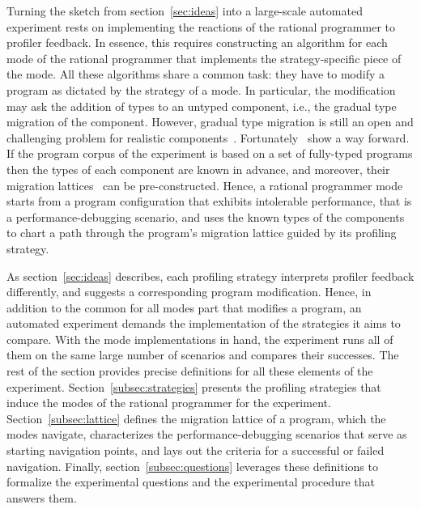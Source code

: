 
Turning the sketch from section~\ref{sec:ideas} into a large-scale
automated experiment rests on implementing the reactions of the rational
programmer to profiler feedback. In essence, this requires constructing an
algorithm for each mode of the rational programmer that implements the
strategy-specific piece of the mode. All these algorithms share a  common
task: they have to modify a program as dictated by the
strategy of a mode.  In particular, the modification may ask the addition
of types to an untyped component, i.e., the gradual type migration of the
component.  However, gradual type migration is still an open and challenging
problem for realistic components~\cite{rch:in-out-infer-gt,
mp:gt-decidable, ccew:gt-migrate, msi:gt-infer-hm, gc:gt-infer,
cagg-solver-based-migration, km:ts-type-evo}.
Fortunately~\citep{lgfd-icfp-2021} show a way forward. If the program
corpus of the experiment is based on a set of fully-typed programs then
the types of each component are known in advance, and moreover, their
migration  lattices~\citep{tfgnvf-popl-2016} can be pre-constructed.
Hence, a rational programmer mode starts from a program configuration
that exhibits intolerable performance, that is a performance-debugging
scenario, and uses the known types of the components to chart a path
through the program's migration lattice guided by its profiling strategy.

As section~\ref{sec:ideas} describes, each profiling strategy interprets
profiler feedback differently, and suggests a corresponding program
modification. Hence, in addition to the common for all modes part that
modifies a program, an automated experiment demands the implementation
of the strategies it aims to compare. With the mode implementations in
hand, the experiment runs all of them on the same large number of
scenarios and compares their successes. The rest of the section provides
precise definitions for all these elements of the experiment.
Section~\ref{subsec:strategies} presents the profiling strategies that induce the
modes of the rational programmer for the experiment.
Section~\ref{subsec:lattice} defines the migration lattice of a program,
which the modes navigate, characterizes the performance-debugging
scenarios that serve as starting navigation points, and lays out  the
criteria for a successful or failed navigation. Finally,
section~\ref{subsec:questions} leverages these definitions to formalize
the experimental questions and the experimental procedure that answers
them.

